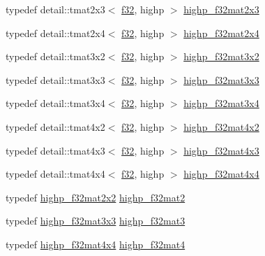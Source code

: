 \begin{CompactItemize}
typedef detail::tmat2x3$<$ \hyperlink{group__gtc__type__precision_g0ec999b57f5330d9021256e96038df04}{f32}, highp $>$ \hyperlink{group__gtc__type__precision_g53613c1b93f81207065a8a935ff02a81}{highp\_\-f32mat2x3}
\item 
typedef detail::tmat2x4$<$ \hyperlink{group__gtc__type__precision_g0ec999b57f5330d9021256e96038df04}{f32}, highp $>$ \hyperlink{group__gtc__type__precision_g9689dbe21bc976ca8069c63300b5887e}{highp\_\-f32mat2x4}
\item 
typedef detail::tmat3x2$<$ \hyperlink{group__gtc__type__precision_g0ec999b57f5330d9021256e96038df04}{f32}, highp $>$ \hyperlink{group__gtc__type__precision_gf36b2b34ea881977c61491b0d3b25a28}{highp\_\-f32mat3x2}
\item 
typedef detail::tmat3x3$<$ \hyperlink{group__gtc__type__precision_g0ec999b57f5330d9021256e96038df04}{f32}, highp $>$ \hyperlink{group__gtc__type__precision_g334eca23d23aef90972fb20c5b749ca3}{highp\_\-f32mat3x3}
\item 
typedef detail::tmat3x4$<$ \hyperlink{group__gtc__type__precision_g0ec999b57f5330d9021256e96038df04}{f32}, highp $>$ \hyperlink{group__gtc__type__precision_ga71f504ecb02f9178026b01013b77ba0}{highp\_\-f32mat3x4}
\item 
typedef detail::tmat4x2$<$ \hyperlink{group__gtc__type__precision_g0ec999b57f5330d9021256e96038df04}{f32}, highp $>$ \hyperlink{group__gtc__type__precision_g4d799497b303c2434fe709f81f6bd4dd}{highp\_\-f32mat4x2}
\item 
typedef detail::tmat4x3$<$ \hyperlink{group__gtc__type__precision_g0ec999b57f5330d9021256e96038df04}{f32}, highp $>$ \hyperlink{group__gtc__type__precision_g5bd692575886422f501a379386e391d9}{highp\_\-f32mat4x3}
\item 
typedef detail::tmat4x4$<$ \hyperlink{group__gtc__type__precision_g0ec999b57f5330d9021256e96038df04}{f32}, highp $>$ \hyperlink{group__gtc__type__precision_gfe24f12e4f5453058caea3f583ad7d9c}{highp\_\-f32mat4x4}
\item 
typedef \hyperlink{group__gtc__type__precision_gf3a2cc948ca6fd168391138ce6fdd100}{highp\_\-f32mat2x2} \hyperlink{group__gtc__type__precision_ged934f561aaf8ad891c0a8f5e719aea8}{highp\_\-f32mat2}
\item 
typedef \hyperlink{group__gtc__type__precision_g334eca23d23aef90972fb20c5b749ca3}{highp\_\-f32mat3x3} \hyperlink{group__gtc__type__precision_g06809818db73785334f839742a9ad85a}{highp\_\-f32mat3}
\item 
typedef \hyperlink{group__gtc__type__precision_gfe24f12e4f5453058caea3f583ad7d9c}{highp\_\-f32mat4x4} \hyperlink{group__gtc__type__precision_gc14c1bfb647e39d459c7489ede2156cc}{highp\_\-f32mat4}

\end{CompactItemize}
